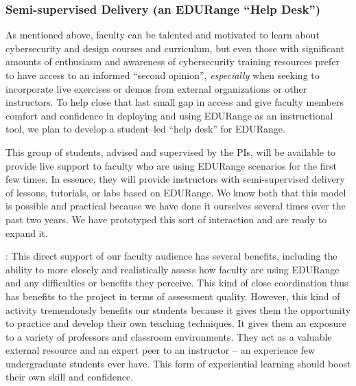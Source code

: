 \subsubsection{Semi-supervised Delivery (an EDURange ``Help Desk'')}

As mentioned above, faculty can be talented and motivated to learn
about cybersecurity and design courses and curriculum, but even those
with significant amounts of enthusiasm and awareness of cybersecurity
training resources prefer to have access to an informed ``second
opinion'', {\em especially} when seeking to incorporate live exercises
or demos from external organizations or other instructors.  To help
close that last small gap in access and give faculty members comfort
and confidence in deploying and using EDURange as an instructional
tool, we plan to develop a student--led ``help desk'' for EDURange.

This group of students, advised and supervised by the PIs, will be
available to provide live support to faculty who are using EDURange
scenarios for the first few times.  In essence, they will provide
instructors with semi-supervised delivery of lessons, tutorials, or
labs based on EDURange.  We know both that this model is possible and
practical because we have done it ourselves several times over the
past two years. We have prototyped this sort of interaction and are
ready to expand it.

: This direct support of our
faculty audience has several benefits, including the ability to more
closely and realistically assess how faculty are using EDURange and
any difficulties or benefits they perceive.  This kind of close
coordination thus has benefits to the project in terms of assessment
quality.  However, this kind of activity tremendously benefits our
students because it gives them the opportunity to practice and develop
their own teaching techniques. It gives them an exposure to a variety
of professors and classroom environments.  They act as a valuable
external resource and an expert peer to an instructor -- an experience
few undergraduate students ever have.  This form of experiential
learning should boost their own skill and confidence.



